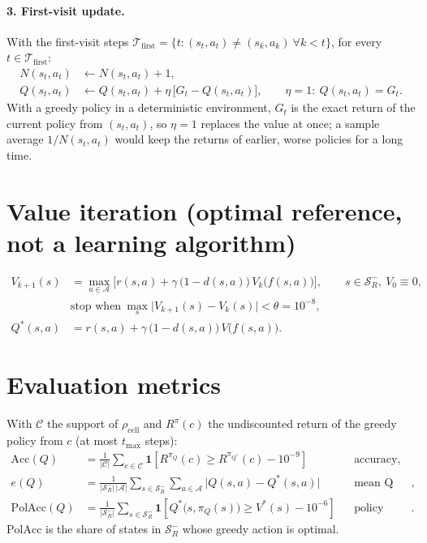 \documentclass[11pt]{article}
\newcommand{\Sset}{\mathcal{S}}
\newcommand{\Aset}{\mathcal{A}}
\newcommand{\ind}[1]{\mathbf{1}\!\left[#1\right]}
\newcommand{\Qs}{Q^{*}}
\begin{document}
\paragraph{3. First-visit update.} With the first-visit steps
$\mathcal{T}_{\mathrm{first}}=\{t:(s_t,a_t)\neq(s_k,a_k)\ \forall k<t\}$, for every $t\in\mathcal{T}_{\mathrm{first}}$:
\begin{align}
N(s_t,a_t) &\leftarrow N(s_t,a_t)+1,\\
Q(s_t,a_t) &\leftarrow Q(s_t,a_t)+\eta\,\big[G_t-Q(s_t,a_t)\big],\qquad \eta = 1:\ Q(s_t,a_t)=G_t.
\end{align}
With a greedy policy in a deterministic environment, $G_t$ is the exact return of the current policy from $(s_t,a_t)$, so $\eta=1$ replaces the value at once; a sample average $1/N(s_t,a_t)$ would keep the returns of earlier, worse policies for a long time.

\section{Value iteration (optimal reference, not a learning algorithm)}
\begin{align}
V_{k+1}(s) &= \max_{a\in\Aset}\Big[r(s,a)+\gamma\,\big(1-d(s,a)\big)\,V_k\big(f(s,a)\big)\Big],\qquad s\in\Sset_R^{-},\ V_0\equiv0,\\
&\text{stop when}\ \max_{s}\big|V_{k+1}(s)-V_k(s)\big|<\theta=10^{-8},\\
\Qs(s,a) &= r(s,a)+\gamma\,\big(1-d(s,a)\big)\,V\big(f(s,a)\big).
\end{align}

\section{Evaluation metrics}
With $\mathcal{C}$ the support of $\rho_{\mathrm{cell}}$ and $R^{\pi}(c)$ the undiscounted return of the greedy policy from $c$ (at most $t_{\max}$ steps):
\begin{align}
\mathrm{Acc}(Q) &= \frac{1}{|\mathcal{C}|}\sum_{c\in\mathcal{C}}\ind{R^{\pi_Q}(c)\ge R^{\pi_{\Qs}}(c)-10^{-9}} && \text{accuracy},\\
e(Q) &= \frac{1}{|\Sset_R^{-}|\,|\Aset|}\sum_{s\in\Sset_R^{-}}\sum_{a\in\Aset}\big|Q(s,a)-\Qs(s,a)\big| && \text{mean Q error},\\
\mathrm{PolAcc}(Q) &= \frac{1}{|\Sset_R^{-}|}\sum_{s\in\Sset_R^{-}}\ind{\Qs\big(s,\pi_Q(s)\big)\ge V^{*}(s)-10^{-6}} && \text{policy accuracy}.
\end{align}
$\mathrm{PolAcc}$ is the share of states in $\Sset_R^{-}$ whose greedy action is optimal.
\end{document}
